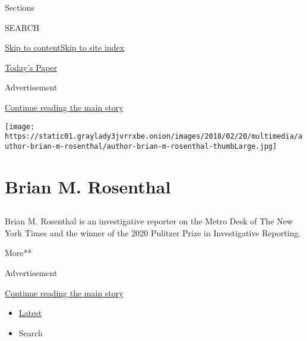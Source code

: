Sections

SEARCH

\protect\hyperlink{site-content}{Skip to
content}\protect\hyperlink{site-index}{Skip to site index}

\href{https://myaccount.nytimes3xbfgragh.onion/auth/login?response_type=cookie\&client_id=vi}{}

\href{https://www.nytimes3xbfgragh.onion/section/todayspaper}{Today's
Paper}

Advertisement

\protect\hyperlink{after-top}{Continue reading the main story}

\texttt{[image: https://static01.graylady3jvrrxbe.onion/images/2018/02/20/multimedia/author-brian-m-rosenthal/author-brian-m-rosenthal-thumbLarge.jpg]}

\hypertarget{brian-m-rosenthal}{%
\section{Brian M. Rosenthal}\label{brian-m-rosenthal}}

\hypertarget{section}{%
\subsection{}\label{section}}

Brian M. Rosenthal is an investigative reporter on the Metro Desk of The
New York Times and the winner of the 2020 Pulitzer Prize in
Investigative Reporting.

More**

Advertisement

\protect\hyperlink{after-mid1}{Continue reading the main story}

\begin{itemize}
\tightlist
\item
  \protect\hyperlink{stream-panel}{Latest}
\item
  Search
\end{itemize}

